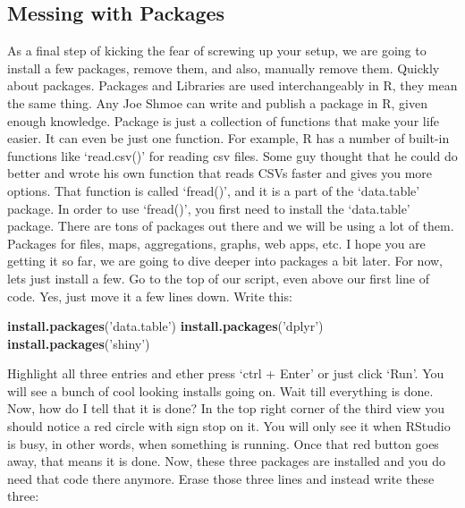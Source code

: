 \documentclass[]{book}
\newenvironment{Shaded}{\begin{snugshade}}{\end{snugshade}}
\newcommand{\KeywordTok}[1]{\textcolor[rgb]{0.13,0.29,0.53}{\textbf{#1}}}
\newcommand{\NormalTok}[1]{#1}
\newcommand{\StringTok}[1]{\textcolor[rgb]{0.31,0.60,0.02}{#1}}
\begin{document}
\hypertarget{messing-with-packages}{%
\subsection{Messing with Packages}\label{messing-with-packages}}

As a final step of kicking the fear of screwing up your setup, we are going to install a few packages, remove them, and also, manually remove them. Quickly about packages. Packages and Libraries are used interchangeably in R, they mean the same thing. Any Joe Shmoe can write and publish a package in R, given enough knowledge. Package is just a collection of functions that make your life easier. It can even be just one function. For example, R has a number of built-in functions like `read.csv()' for reading csv files. Some guy thought that he could do better and wrote his own function that reads CSVs faster and gives you more options. That function is called `fread()', and it is a part of the `data.table' package. In order to use `fread()', you first need to install the `data.table' package. There are tons of packages out there and we will be using a lot of them. Packages for files, maps, aggregations, graphs, web apps, etc. I hope you are getting it so far, we are going to dive deeper into packages a bit later. For now, lets just install a few. Go to the top of our script, even above our first line of code. Yes, just move it a few lines down. Write this:

\begin{Shaded}
\begin{Highlighting}[]
\KeywordTok{install.packages}\NormalTok{(}\StringTok{'data.table'}\NormalTok{)}
\KeywordTok{install.packages}\NormalTok{(}\StringTok{'dplyr'}\NormalTok{)}
\KeywordTok{install.packages}\NormalTok{(}\StringTok{'shiny'}\NormalTok{)}
\end{Highlighting}
\end{Shaded}

Highlight all three entries and ether press `ctrl + Enter' or just click `Run'. You will see a bunch of cool looking installs going on. Wait till everything is done. Now, how do I tell that it is done? In the top right corner of the third view you should notice a red circle with sign stop on it. You will only see it when RStudio is busy, in other words, when something is running. Once that red button goes away, that means it is done. Now, these three packages are installed and you do need that code there anymore. Erase those three lines and instead write these three:
\end{document}
